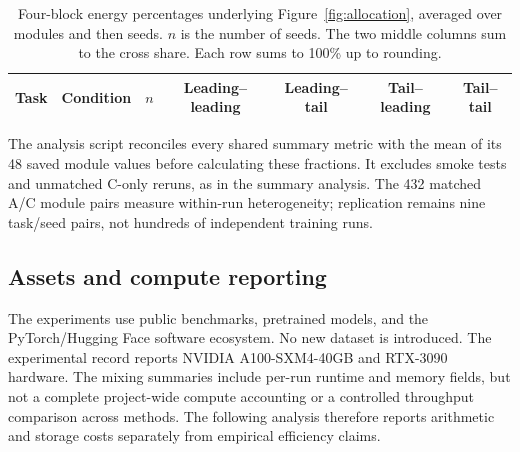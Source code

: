 \begin{table}[ht]
\centering
\caption{Four-block energy percentages underlying Figure~\ref{fig:allocation}, averaged over modules and then seeds. $n$ is the number of seeds. The two middle columns sum to the cross share. Each row sums to 100\% up to rounding.}
\label{tab:blockallocation}
\begin{tabular}{llccccc}
\toprule
Task & Condition & $n$ & Leading--leading & Leading--tail & Tail--leading & Tail--tail\\
\midrule
\bottomrule
\end{tabular}
\end{table}

The analysis script reconciles every shared summary metric with the mean of its 48 saved module values before calculating these fractions. It excludes smoke tests and unmatched C-only reruns, as in the summary analysis. The 432 matched A/C module pairs measure within-run heterogeneity; replication remains nine task/seed pairs, not hundreds of independent training runs.

\subsection{Assets and compute reporting}
The experiments use public benchmarks, pretrained models, and the PyTorch/Hugging Face software ecosystem. No new dataset is introduced. The experimental record reports NVIDIA A100-SXM4-40GB and RTX-3090 hardware. The mixing summaries include per-run runtime and memory fields, but not a complete project-wide compute accounting or a controlled throughput comparison across methods. The following analysis therefore reports arithmetic and storage costs separately from empirical efficiency claims.
